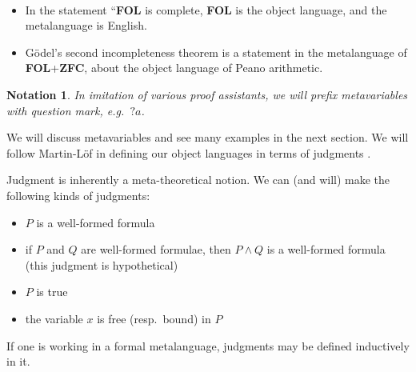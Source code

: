 \documentclass[12pt,twoside,draft]{reedthesis}
\makeatletter
\let\oldindex\index
\renewcommand{\index}[1]{\oldindex{#1}\marginpar{\footnotesize\color{index}index: #1}}
\newcommand{\indeX}[1]{\oldindex{#1}}
\newcommand{\abbreviation}[1]{\textbf{#1}\indeX{#1@\textbf{#1}}} %
\newcommand{\define}[1]{\textbf{#1}} %
\newtheorem{notation}[theorem]{Notation}
\makeatother
\begin{document}

\begin{example}
  \
  \begin{itemize}
    \itemsep0em
    \item In the statement ``\abbreviation{FOL} is complete, \abbreviation{FOL}
      is the object language, and the metalanguage is English.
    \item G\"odel's second incompleteness theorem is a statement in the
      metalanguage of \abbreviation{FOL}+\abbreviation{ZFC}, about the object
      language of Peano arithmetic.
  \end{itemize}
\end{example}


\begin{notation}
  In imitation of various proof assistants, we will prefix metavariables with
  question mark, e.g.\ $?a$.
\end{notation}

We will discuss metavariables and see many examples in the next section. 
We will follow Martin-L\"of in defining our object languages in terms of
judgments \cite{martin-lof-meanings}.


\begin{example}
  Judgment is inherently a meta-theoretical notion.
	We can (and will) make the following kinds of judgments:
  \begin{itemize}
    \itemsep0em
    \item $P$ is a well-formed formula 
    \item if $P$ and $Q$ are well-formed formulae, then $P\land Q$ is a
      well-formed formula (this judgment is hypothetical)
    \item $P$ is true
    \item the variable $x$ is free (resp.\ bound) in $P$ 
  \end{itemize}
  If one is working in a formal metalanguage, judgments may be defined
  inductively in it.
\end{example}
\end{document}
